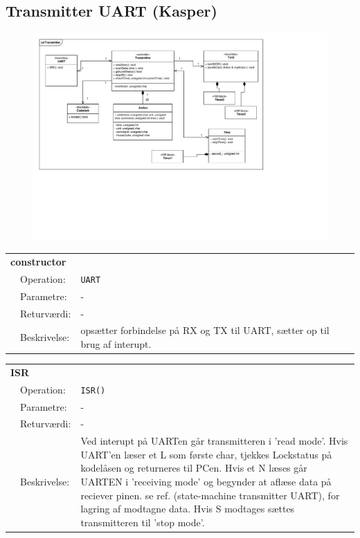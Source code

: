 \subsection{Transmitter UART (Kasper)}

\begin{figure}[h]
\centering
\includegraphics[scale=1,clip=true, trim=25 433 715 60]{Systemarkitektur/diagrammer/Transmitter_Klassediagram} %
\end{figure}

\begin{table}[h]
\begin{tabularx}{\textwidth}{p{0.6 cm} l X} %
\multicolumn{3}{l}{\textbf{constructor}}\\
& Operation: & %
\texttt{UART} 
\\ & Parametre: & %
-
\\ & Returværdi: & %
- 
\\ & Beskrivelse: & %
opsætter forbindelse på RX og TX til UART, sætter op til brug af interupt.
\\ \end{tabularx}
\end{table}

\clearpage

\begin{table}[h]
\begin{tabularx}{\textwidth}{p{0.6 cm} l X} %
\multicolumn{3}{l}{\textbf{ISR}}\\
& Operation: & %
\texttt{ISR()} 
\\ & Parametre: & %
-
\\ & Returværdi: & %
- 
\\ & Beskrivelse: & %
Ved interupt på UARTen går transmitteren i 'read mode'. Hvis UART'en læser et L som første char, tjekkes Lockstatus på kodelåsen og returneres til PCen. Hvis et N læses går UARTEN i 'receiving mode' og begynder at aflæse data på reciever pinen. se ref. (state-machine transmitter UART), for lagring af modtagne data. Hvis S modtages sættes transmitteren til 'stop mode'.
\\ \end{tabularx}
\end{table}


